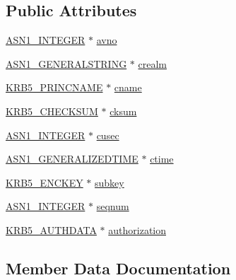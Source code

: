 \subsection*{Public Attributes}
\begin{DoxyCompactItemize}
\item 
\hyperlink{ossl__typ_8h_af4335399bf9774cb410a5e93de65998b}{A\+S\+N1\+\_\+\+I\+N\+T\+E\+G\+ER} $\ast$ \hyperlink{structkrb5__authenticator__st_a9ed01e68c50931dd9d7ab5bc02c1201d}{avno}
\item 
\hyperlink{ossl__typ_8h_a7357d22f3b42ad606a72aad7f1668dd3}{A\+S\+N1\+\_\+\+G\+E\+N\+E\+R\+A\+L\+S\+T\+R\+I\+NG} $\ast$ \hyperlink{structkrb5__authenticator__st_afe6a1007edb042a4152f9f7c81576568}{crealm}
\item 
\hyperlink{krb5__asn_8h_aaf05b59cc572d53060ef9a86133e10e1}{K\+R\+B5\+\_\+\+P\+R\+I\+N\+C\+N\+A\+ME} $\ast$ \hyperlink{structkrb5__authenticator__st_a97834129a3f43febc53ebd5335de32b7}{cname}
\item 
\hyperlink{krb5__asn_8h_a878f140fb5a9b1593e4be35776f35df9}{K\+R\+B5\+\_\+\+C\+H\+E\+C\+K\+S\+UM} $\ast$ \hyperlink{structkrb5__authenticator__st_ac34bce7526107466b7462957744ddee6}{cksum}
\item 
\hyperlink{ossl__typ_8h_af4335399bf9774cb410a5e93de65998b}{A\+S\+N1\+\_\+\+I\+N\+T\+E\+G\+ER} $\ast$ \hyperlink{structkrb5__authenticator__st_a0338e47f6edaf74442f46dc6ad8fbfcb}{cusec}
\item 
\hyperlink{ossl__typ_8h_abd19ea5b527807ce3a516e6a41440f84}{A\+S\+N1\+\_\+\+G\+E\+N\+E\+R\+A\+L\+I\+Z\+E\+D\+T\+I\+ME} $\ast$ \hyperlink{structkrb5__authenticator__st_acdcdd96312d76a5cb2398768e5ed0e69}{ctime}
\item 
\hyperlink{krb5__asn_8h_acaf98c0d412e7f07cfe55aa9c72d92f0}{K\+R\+B5\+\_\+\+E\+N\+C\+K\+EY} $\ast$ \hyperlink{structkrb5__authenticator__st_a03ed3e43b6e55c3109d5531ee904b8bf}{subkey}
\item 
\hyperlink{ossl__typ_8h_af4335399bf9774cb410a5e93de65998b}{A\+S\+N1\+\_\+\+I\+N\+T\+E\+G\+ER} $\ast$ \hyperlink{structkrb5__authenticator__st_a536a8d151e989aa249609ec5d482ed9c}{seqnum}
\item 
\hyperlink{krb5__asn_8h_ad648cb78dbf5045ce31be50636fc8f02}{K\+R\+B5\+\_\+\+A\+U\+T\+H\+D\+A\+TA} $\ast$ \hyperlink{structkrb5__authenticator__st_afbcfe629c218e03f97fecdfa8f594460}{authorization}
\end{DoxyCompactItemize}


\subsection{Member Data Documentation}
